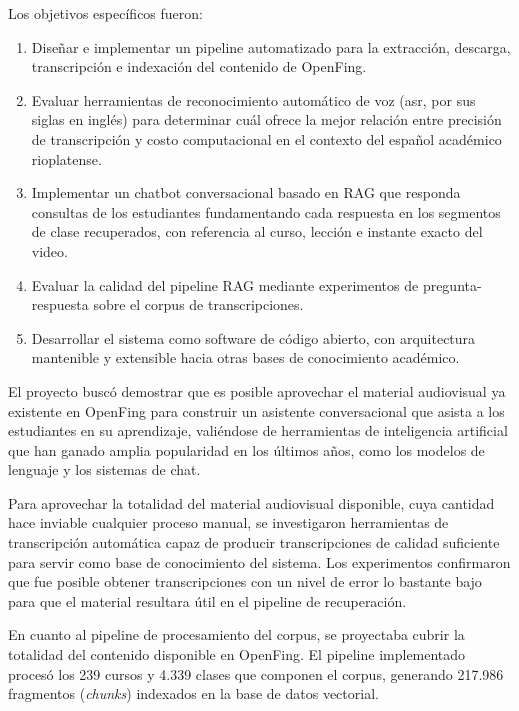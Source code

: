 Los objetivos específicos fueron:

\begin{enumerate}
    \item Diseñar e implementar un pipeline automatizado para la extracción,
    descarga, transcripción e indexación del contenido de OpenFing.

    \item Evaluar herramientas de reconocimiento automático de voz (\acrshort{asr}, por sus siglas en inglés) \cite{SpeechandLanguageProcessing}
    para determinar cuál ofrece la mejor relación entre precisión de transcripción
    y costo computacional en el contexto del español académico rioplatense.

    \item Implementar un chatbot conversacional basado en RAG que responda
    consultas de los estudiantes fundamentando cada respuesta en los segmentos
    de clase recuperados, con referencia al curso, lección e instante exacto del
    video.

    \item Evaluar la calidad del pipeline RAG mediante experimentos de pregunta-respuesta
    sobre el corpus de transcripciones.

    \item Desarrollar el sistema como software de código abierto, con arquitectura
    mantenible y extensible hacia otras bases de conocimiento académico.
\end{enumerate}



El proyecto buscó demostrar que es posible aprovechar el material audiovisual ya existente en OpenFing para construir un asistente conversacional que asista a los estudiantes en su aprendizaje, valiéndose de herramientas de inteligencia artificial que han ganado amplia popularidad en los últimos años, como los modelos de lenguaje y los sistemas de chat.

Para aprovechar la totalidad del material audiovisual disponible, cuya cantidad hace inviable cualquier proceso manual, se investigaron herramientas de transcripción automática capaz de producir transcripciones de calidad suficiente para servir como base de conocimiento del sistema. Los experimentos confirmaron que fue posible obtener transcripciones con un nivel de error lo bastante bajo para que el material resultara útil en el pipeline de recuperación.

En cuanto al pipeline de procesamiento del corpus, se proyectaba cubrir la totalidad del contenido disponible en OpenFing. El pipeline implementado procesó los 239 cursos y 4.339 clases que componen el corpus, generando 217.986 fragmentos (\textit{chunks}) indexados en la base de datos vectorial.

